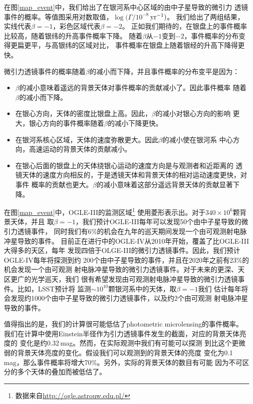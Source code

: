 在图\ref{map_event}中，我们给出了在银河系中心区域的由中子星导致的微引力
透镜事件的概率。等值图采用对数取值，$\log(\Gamma/10^{-8}$\,$\rm{yr^{-1}})$。
我们给出了两组结果，实线代表$\beta=-1$，彩色区域代表$\beta=-2$。
正如我们期待的，在银盘上的事件概率比较高，随着银纬的升高事件概率下降。
随着$\beta$从$-1$变到$-2$，事件概率的分布变得更扁更平，与高银纬的区域对比，
事件概率在银盘上随着银经的升高下降得更快。

微引力透镜事件的概率随着$\beta$的减小而下降，并且事件概率的分布变平是因为：
\begin{itemize}
\item $\beta$的减小意味着遥远的背景天体对事件概率的贡献减小了。因此事件概率
随着$\beta$的减小而下降。
\item 在银心方向，天体的密度比银盘上高。因此，$\beta$的减小对银心方向的影响
更大，银心方向的事件概率随着$\beta$的减小下降更快。
\item 在银河系核心区域，天体的速度弥散更大。因此$\beta$的减小使在银河系
中心方向，高速运动的背景天体的贡献减小。
\item 在银心后面的银盘上的天体绕银心运动的速度方向是与观测者和近距离的
透镜天体的速度方向相反的，于是透镜天体和背景天体的相对运动速度更快，对事件
概率的贡献也更大。$\beta$的减小意味着这部分遥远背景天体的贡献显著下降。
\end{itemize}

在图\ref{map_event}中，OGLE-III的监测区域\footnote{数据来自\url{http://ogle.astrouw.edu.pl/}}
使用菱形表示出。对于$340\times10^6$颗背景天体\supercite{Szymanski}，并且
取$\beta=-1$，我们预计OGLE-III每年可以发现50个由中子星导致的微引力透镜事件，
同时我们有6\%的机会在九年的巡天期间发现一个由可观测射电脉冲星导致的事件。
目前正在进行中的OGLE-IV从2010年开始，覆盖了比OGLE-III大得多的天区，每年
发现四倍于OLGE-III的微引力透镜事件。因此，我们预计OGLE-IV每年将探测到约
200个由中子星导致的事件，并且在2020年之前有23\%的机会发现一个由可观测
射电脉冲星导致的微引力透镜事件。对于未来的更深、天区更广的光学巡天，我们
很有希望发现由可观测射电脉冲星导致的微引力透镜事件。比如，LSST预计将
监测$\sim10^{10}$颗银河系中的天体\supercite{ivez12a}，取$\beta=-1$我们
估计每年将会发现约1000个由中子星导致的微引力透镜事件，以及约2个由可观测
射电脉冲星导致的事件。

值得指出的是，我们的计算很可能低估了photometric microlensing的事件概率。
我们在计算中使用Einstein半径作为引力透镜事件发生的截面，对应的背景天体亮度的
变化是约0.32\,mag。然而，在实际观测中我们有可能可以探测
到比这个更微弱的背景天体亮度的变化。假设我们可以观测到的背景天体的亮度
变化为0.1\,mag，那么事件概率将增大70\%。另外，实际的背景天体的数目有可能
因为不可区分的多个天体的叠加而被低估了\supercite{Smith07}。
  
